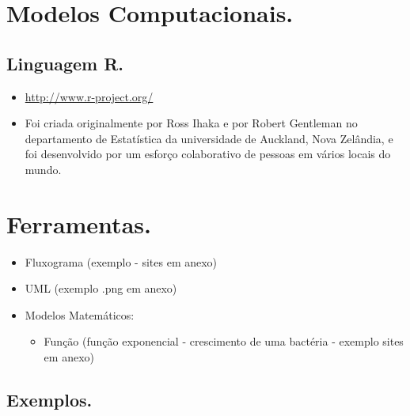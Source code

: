 \documentclass[a4paper,12pt]{article}
\begin{document}
\section{Modelos Computacionais.}

\subsection{Linguagem R.}
\begin{itemize}
\item \url{http://www.r-project.org/}
\item Foi criada originalmente por Ross Ihaka e por Robert Gentleman no departamento de Estatística da universidade de Auckland, Nova Zelândia, e foi desenvolvido por um esforço colaborativo de pessoas em vários locais do mundo.
\end{itemize}

\section{Ferramentas.}
\begin{itemize}
\item Fluxograma (exemplo - sites em anexo)
\item UML (exemplo .png em anexo)
\item Modelos Matemáticos:
\begin{itemize}
\item Função (função exponencial - crescimento de uma bactéria - exemplo sites em anexo) 
\end{itemize}
\end{itemize}

\subsection{Exemplos.}
\end{document}

